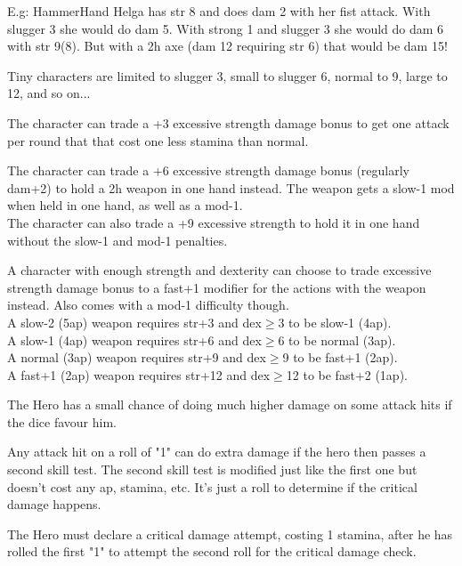 E.g: HammerHand Helga has str 8 and does dam 2 with her fist attack. With slugger 3 she would do dam 5. With strong 1 and slugger 3 she would do dam 6 with str 9(8). But with a 2h axe (dam 12 requiring str 6) that would be dam 15! 

Tiny characters are limited to slugger 3, small to slugger 6, normal to 9, large to 12, and so on...

 The character can trade a +3 excessive strength damage bonus to get one attack per round that that cost one less stamina than normal.


 The character can trade a +6 excessive strength damage bonus (regularly dam+2) to hold a 2h weapon in one hand instead. The weapon gets a slow-1 mod when held in one hand, as well as a mod-1. \\
The character can also trade a +9 excessive strength to hold it in one hand without the slow-1 and mod-1 penalties.


 A character with enough strength and dexterity can choose to trade excessive strength damage bonus to a fast+1 modifier for the actions with the weapon instead. Also comes with a mod-1 difficulty though. \\
A slow-2 (5ap) weapon requires str+3 and dex$\geq$3 to be slow-1 (4ap).\\
A slow-1 (4ap) weapon requires str+6 and dex$\geq$6 to be normal (3ap).\\
A normal (3ap) weapon requires str+9 and dex$\geq$9 to be fast+1 (2ap).\\
A fast+1 (2ap) weapon requires str+12 and dex$\geq$12 to be fast+2 (1ap).


 The Hero has a small chance of doing much higher damage on some attack hits if the dice favour him.

Any attack hit on a roll of "1" can do extra damage if the hero then passes a second skill test. The second skill test is modified just like the first one but doesn't cost any ap, stamina, etc. It's just a roll to determine if the critical damage happens.

The Hero must declare a critical damage attempt, costing 1 stamina, after he has rolled the first "1" to attempt the second roll for the critical damage check.

